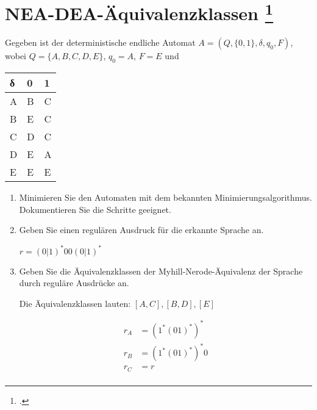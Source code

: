 \documentclass{lehramt-informatik-aufgabe}
\begin{document}
\section{NEA-DEA-Äquivalenzklassen
\footcite{theo:ab:1}}

Gegeben ist der deterministische endliche Automat $A = (Q, \{0, 1\},
\delta, q_0 , F)$, wobei $Q = \{A, B, C, D, E\}$, $q_0 = A$, $F = {E}$ und

\begin{center}
\begin{tabular}{l||l|l}
δ & 0 & 1 \\\hline\hline
A & B & C \\\hline
B & E & C \\\hline
C & D & C \\\hline
D & E & A \\\hline
E & E & E \\\hline
\end{tabular}
\end{center}

\begin{enumerate}
\item Minimieren Sie den Automaten mit dem bekannten
Minimierungsalgorithmus. Dokumentieren Sie die Schritte geeignet.

\begin{liAntwort}
\end{liAntwort}

\item Geben Sie einen regulären Ausdruck für die erkannte Sprache an.

\begin{liAntwort}
$r = (0|1)^*00(0|1)^*$
\end{liAntwort}

\item Geben Sie die Äquivalenzklassen der Myhill-Nerode-Äquivalenz der
Sprache durch reguläre Ausdrücke an.

\begin{liAntwort}
Die Äquivalenzklassen lauten: $[A, C], [B, D], [E]$

\begin{align*}
r_A &= (1^*(01)^*)^*\\
r_B &= (1^*(01)^*)^*0\\
r_C &= r\\
\end{align*}
\end{liAntwort}
\end{enumerate}
\end{document}
